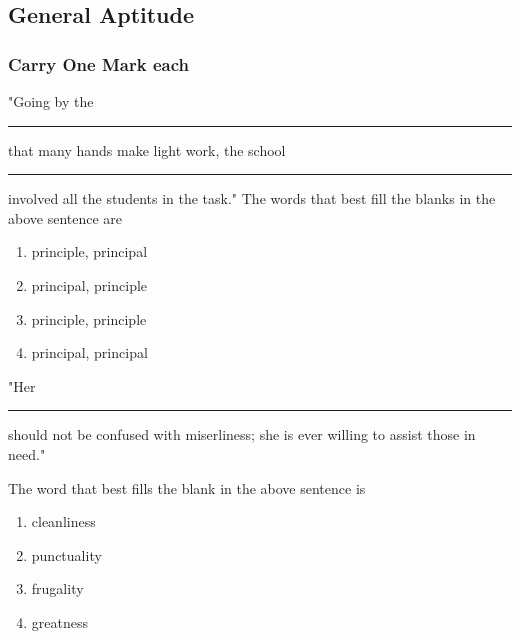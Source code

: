 \iffalse
\author{EE24BTECH11049}
\section{xe}
\chapter{2018}
\fi

\subsection{General Aptitude}
\subsubsection{Carry One Mark each}
	\item
	"Going by the \rule{1cm}{0.1pt} that many hands make light work, the school \rule{1cm}{0.1pt} involved all the students in the task."
	The words that best fill the blanks in the above sentence are

	\hfill{}

	\begin{multicols}{2}
		\begin{enumerate}
			\item principle, principal
			\item principal, principle
			\item principle, principle
			\item principal, principal
		\end{enumerate}
	\end{multicols}

	\item 
	"Her \rule{1cm}{0.1pt} should not be confused with miserliness; she is ever willing to assist those in need."

	The word that best fills the blank in the above sentence is
	
	\hfill{}

	\begin{multicols}{2}
		\begin{enumerate}
			\item cleanliness 
			\item punctuality
			\item frugality
			\item greatness
		\end{enumerate}
	\end{multicols}

